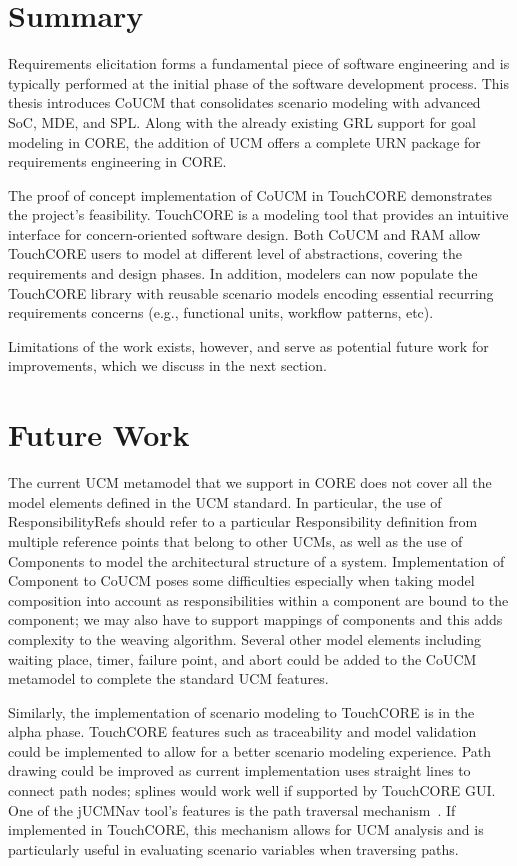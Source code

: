 \section{Summary}

Requirements elicitation forms a fundamental piece of software engineering and is typically performed at the initial phase of the software development process. This thesis introduces CoUCM that consolidates scenario modeling with advanced SoC, MDE, and SPL. Along with the already existing GRL support for goal modeling in CORE, the addition of UCM offers a complete URN package for requirements engineering in CORE.

The proof of concept implementation of CoUCM in TouchCORE demonstrates the project's feasibility. TouchCORE is a modeling tool that provides an intuitive interface for concern-oriented software design. Both CoUCM and RAM allow TouchCORE users to model at different level of abstractions, covering the requirements and design phases. In addition, modelers can now populate the TouchCORE library with reusable scenario models encoding essential recurring requirements concerns (e.g., functional units, workflow patterns, etc).

Limitations of the work exists, however, and serve as potential future work for improvements, which we discuss in the next section.

\section{Future Work}

The current UCM metamodel that we support in CORE does not cover all the model elements defined in the UCM standard. In particular, the use of {\cls ResponsibilityRef}s should refer to a particular {\cls Responsibility} definition from multiple reference points that belong to other UCMs, as well as the use of {\cls Component}s to model the architectural structure of a system. Implementation of {\cls Component} to CoUCM poses some difficulties especially when taking model composition into account as responsibilities within a component are bound to the component; we may also have to support mappings of components and this adds complexity to the weaving algorithm. Several other model elements including waiting place, timer, failure point, and abort could be added to the CoUCM metamodel to complete the standard UCM features.

Similarly, the implementation of scenario modeling to TouchCORE is in the alpha phase. TouchCORE features such as traceability and model validation could be implemented to allow for a better scenario modeling experience. Path drawing could be improved as current implementation uses straight lines to connect path nodes; splines would work well if supported by TouchCORE GUI. One of the jUCMNav tool's features is the path traversal mechanism~\cite{kealey2007enhanced2}. If implemented in TouchCORE, this mechanism allows for UCM analysis and is particularly useful in evaluating scenario variables when traversing paths.

